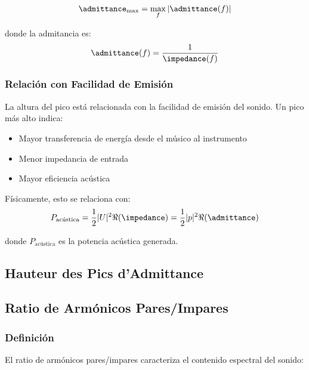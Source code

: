 \begin{equation}
\admittance_{\max} = \max_f |\admittance(f)|
\label{eq:admittance_peak}
\end{equation}

donde la admitancia es:
\begin{equation}
\admittance(f) = \frac{1}{\impedance(f)}
\end{equation}

\subsubsection{Relación con Facilidad de Emisión}

La altura del pico está relacionada con la facilidad de emisión del sonido. Un pico más alto indica:

\begin{itemize}
    \item Mayor transferencia de energía desde el músico al instrumento
    \item Menor impedancia de entrada
    \item Mayor eficiencia acústica
\end{itemize}

Físicamente, esto se relaciona con:
\begin{equation}
P_{\text{acústica}} = \frac{1}{2} |U|^2 \Re(\impedance) = \frac{1}{2} |p|^2 \Re(\admittance)
\end{equation}

donde $P_{\text{acústica}}$ es la potencia acústica generada.

\subsection{Hauteur des Pics d'Admittance}


\subsection{Ratio de Armónicos Pares/Impares}

\subsubsection{Definición}

El ratio de armónicos pares/impares caracteriza el contenido espectral del sonido:

